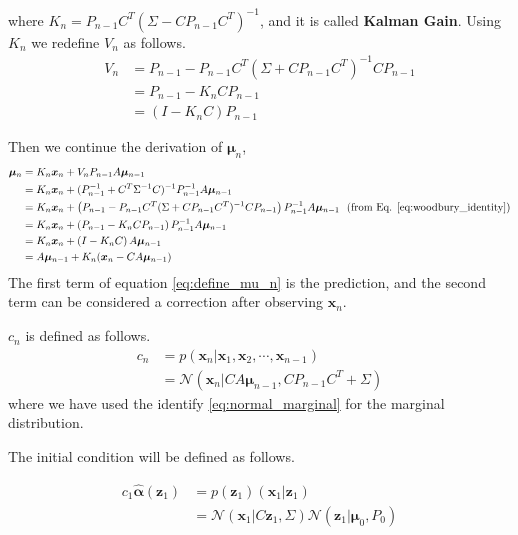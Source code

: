 \documentclass[a4]{article}
\begin{document}
where $K_n = P_{n-1}C^T(\Sigma - CP_{n-1}C^T)^{-1}$, and it is called \textbf{Kalman Gain}.
Using $K_n$ we redefine $V_n$ as follows.
\begin{equation}
\begin{aligned}
V_n &= P_{n-1} - P_{n-1}C^T(\Sigma + CP_{n-1}C^T)^{-1}CP_{n-1}\\
 &= P_{n-1} - K_nCP_{n-1}\\
 &= (I - K_nC)P_{n-1}
\end{aligned}
\end{equation}

Then we continue the derivation of $\bm{\mu}_n$, 
\begin{equation}
\begin{aligned}
\bm{\mu}_n &= K_n\bm{x}_n + V_nP_{n-1}A\bm{\mu}_{n-1}\\
&= K_n\bm{x}_n + (P_{n-1}^{-1} + C^T\Sigma^{-1}C)^{-1}P_{n-1}^{-1}A\bm{\mu}_{n-1}\\
&= K_n\bm{x}_n + 
\left( P_{n-1} - P_{n-1}C^T(\Sigma + CP_{n-1}C^T)^{-1}CP_{n-1}\right)
P_{n-1}^{-1}A\bm{\mu}_{n-1} \:\:\:\text{(from Eq. \ref{eq:woodbury_identity})}\\
&= K_n\bm{x}_n + \left( P_{n-1} - K_n CP_{n-1}\right)P_{n-1}^{-1}A\bm{\mu}_{n-1}\\
&= K_n\bm{x}_n + \left( I - K_n C\right)A\bm{\mu}_{n-1}\\
&= A\bm{\mu}_{n-1} + K_n( \bm{x}_n - CA\bm{\mu}_{n-1})\label{eq:define_mu_n}\\
\end{aligned}
\end{equation}
The first term of equation \ref{eq:define_mu_n} is the prediction, and the second term can be considered
a correction after observing $\bm{x}_n$.


$c_n$ is defined as follows.
\begin{equation}
\begin{aligned}
c_n &= p(\bm{x}_n | \bm{x}_1, \bm{x}_2, \cdots,  \bm{x}_{n-1})\\
&= \mathcal{N}(\bm{x}_n|CA\bm{\mu}_{n-1}, CP_{n-1}C^T + \Sigma)
\end{aligned}
\end{equation}
where we have used the identify \ref{eq:normal_marginal} for the marginal distribution.


The initial condition will be defined as follows.

\begin{equation}
\begin{aligned}
c_1\hat{\bm{\alpha}}(\bm{z}_1) &= p(\bm{z}_1)(\bm{x}_1|\bm{z}_1)\\
 &= \mathcal{N}(\bm{x}_1|C\bm{z}_1, \Sigma)\mathcal{N}(\bm{z}_1|\bm{\mu}_0, P_0)
\end{aligned}
\end{equation}
\end{document}
